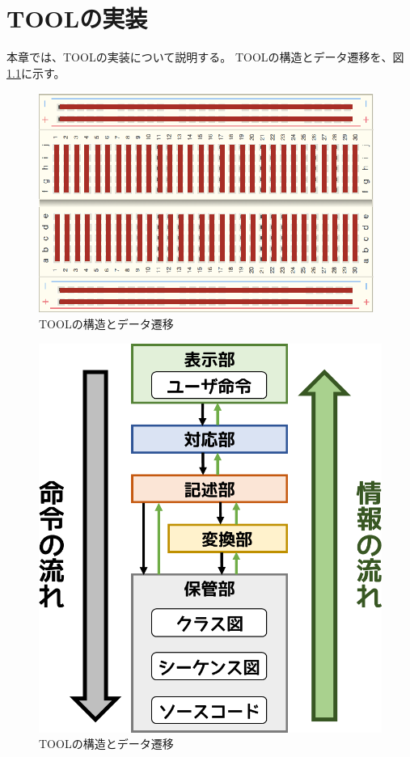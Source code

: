 \documentclass[uplatex, report, a4j, 10pt, dvipdfmx]{jsbook}
\newcommand{\tool}{TOOL}
\begin{document}
\chapter{\tool{}の実装}\label{cha:Implementation}

本章では、\tool{}の実装について説明する。
\tool{}の構造とデータ遷移を、図\ref{fig:toolStructure}に示す。

\begin{figure}[t]
	\centering
	\includegraphics[width=.8\linewidth]{./figs/breadboard.eps}
	\caption{\tool{}の構造とデータ遷移}
	\label{fig:toolStructure}
\end{figure}

\begin{figure}[tp]
  \begin{center}
  \includegraphics[keepaspectratio, width=160mm]{./figs/retussStructure.png}
	\caption{\tool{}の構造とデータ遷移}
	\label{fig:toolStructure2}
\end{center}
\end{figure}
\end{document}

